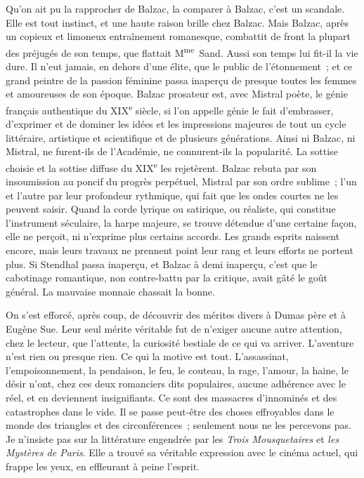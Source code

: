 \documentclass[french,twoside]{book} %
\begin{document}
Qu’on ait pu la rapprocher de Balzac, la comparer à Balzac, c’est un scandale. Elle est tout instinct, et une haute raison brille chez Balzac. Mais Balzac, après un copieux et limoneux entraînement romanesque, combattit de front la plupart des préjugés de son temps, que flattait M\textsuperscript{me} Sand. Aussi son temps lui fit-il la vie dure. Il n’eut jamais, en dehors d’une élite, que le public de l’étonnement ; et ce grand peintre de la passion féminine passa inaperçu de presque toutes les femmes et amoureuses de son époque. Balzac prosateur est, avec Mistral poète, le génie français authentique du XIX\textsuperscript{e} siècle, si l’on appelle génie le fait d’embrasser, d’exprimer et de dominer les idées et les impressions majeures de tout un cycle littéraire, artistique et scientifique et de plusieurs générations. Ainsi ni Balzac, ni Mistral, ne furent-ils de l’Académie, ne connurent-ils la popularité. La sottise choisie et la sottise diffuse du XIX\textsuperscript{e} les rejetèrent. Balzac rebuta par son insoumission au poncif du progrès perpétuel, Mistral par son ordre sublime ; l’un et l’autre par leur profondeur rythmique, qui fait que les ondes courtes ne les peuvent saisir. Quand la corde lyrique ou satirique, ou réaliste, qui constitue l’instrument séculaire, la harpe majeure, se trouve détendue d’une certaine façon, elle ne perçoit, ni n’exprime plus certains accords. Les grands esprits naissent encore, mais leurs travaux ne prennent point leur rang et leurs efforts ne portent plus. Si Stendhal passa inaperçu, et Balzac à demi inaperçu, c’est que le cabotinage romantique, non contre-battu par la critique, avait gâté le goût général. La mauvaise monnaie chassait la bonne.\par
On s’est efforcé, après coup, de découvrir des mérites divers à Dumas père et à Eugène Sue. Leur seul mérite véritable fut de n’exiger aucune autre attention, chez le lecteur, que l’attente, la curiosité bestiale de ce qui va arriver. L’aventure n’est rien ou presque rien. Ce qui la motive est tout. L’assassinat, l’empoisonnement, la pendaison, le feu, le couteau, la rage, l’amour, la haine, le désir n’ont, chez ces deux romanciers dits populaires, aucune adhérence avec le réel, et en deviennent insignifiants. Ce sont des massacres d’innominés et des catastrophes dans le vide. Il se passe peut-être des choses effroyables dans le monde des triangles et des circonférences ; seulement nous ne les percevons pas. Je n’insiste pas sur la littérature engendrée par les {\itshape Trois Mousquetaires} et {\itshape les Mystères de Paris}. Elle a trouvé sa véritable expression avec le cinéma actuel, qui frappe les yeux, en effleurant à peine l’esprit.\par
\end{document}
